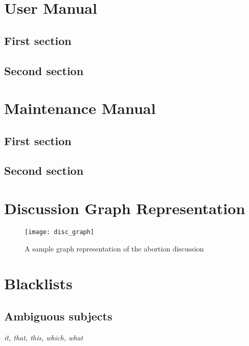 \begin{appendices}
    \makeatletter
    \makeatother

    \chapter{User Manual}
      \section{First section}
      \section{Second section}

    \chapter{Maintenance Manual\label{app:maintain}}
      \section{First section}
      \section{Second section}

    \chapter{Discussion Graph Representation\label{app:disc_graph}}
      \begin{figure}[h]
        \caption{A sample graph representation of the abortion discussion}
        \centering
        \texttt{[image: disc\_graph]}
      \end{figure}

    \chapter{Blacklists\label{app:blacklists}}
      \section{Ambiguous subjects}
        \textit{it, that, this, which, what}


\end{appendices}
